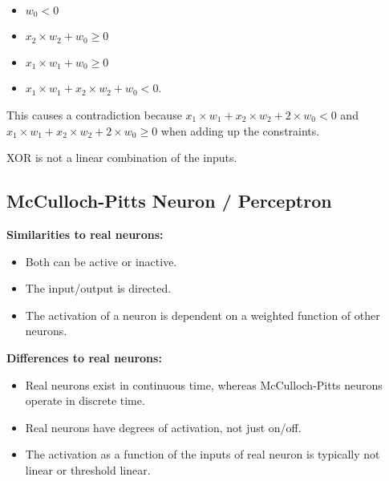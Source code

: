 \documentclass[main]{subfiles}
\begin{document}
\begin{itemize}[noitemsep,nolistsep]
	\item $w_0 < 0$
	\item $x_2 \times w_2 + w_0 \geq 0$
	\item $x_1 \times w_1 + w_0 \geq 0$
	\item $x_1 \times w_1 + x_2 \times w_2 + w_0 < 0$.
\end{itemize}

This causes a contradiction because $x_1 \times w_1 + x_2 \times w_2 + 2 \times w_0 < 0$ and $x_1 \times w_1 + x_2 \times w_2 + 2 \times w_0 \geq 0$ when adding up the constraints.

XOR is not a linear combination of the inputs.

\subsection{McCulloch-Pitts Neuron / Perceptron}
\textbf{Similarities to real neurons:}
\begin{itemize}[noitemsep,nolistsep]
	\item Both can be active or inactive.
	\item The input/output is directed.
	\item The activation of a neuron is dependent on a weighted function of other neurons.
\end{itemize}
\textbf{Differences to real neurons:}
\begin{itemize}[noitemsep,nolistsep]
	\item Real neurons exist in continuous time, whereas McCulloch-Pitts neurons operate in discrete time.
	\item Real neurons have degrees of activation, not just on/off.
	\item The activation as a function of the inputs of real neuron is typically not linear or threshold linear.
\end{itemize}
\end{document}
